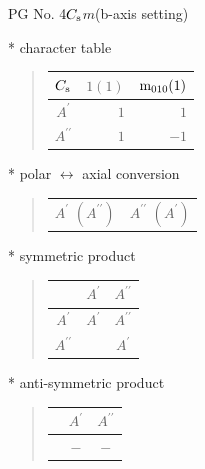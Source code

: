 \documentclass[fleqn,8pt,landscape]{jsarticle}
\begin{document}
\setcounter{MaxMatrixCols}{32}

\renewcommand{\tablename}{Table~}
\renewcommand{\figurename}{Figure~}
\begin{center}
\LARGE
PG No. 4\quad$C_{\rm s}$\quad$m$\quad(b-axis setting)\quad[ monoclinic ]
\end{center}

* character table
\begin{quote}
\begin{tabular}{crr} \hline \hline
$ C_{\rm s} $ & $ 1(1) $ & $ {\rm m}_{010}(1) $ \\ \hline
$ A^{\prime} $ & $ 1 $ & $ 1 $ \\
$ A^{\prime\prime} $ & $ 1 $ & $ -1 $ \\
 \hline \hline
\end{tabular}
\end{quote}

* polar $\leftrightarrow$ axial conversion
\begin{quote}
\begin{tabular}{cc}
$ A^{\prime}\,\,(A^{\prime\prime}) $ & $ A^{\prime\prime}\,\,(A^{\prime}) $
\end{tabular}
\end{quote}

* symmetric product
\begin{quote}
\begin{tabular}{c|cc} \hline \hline
 & $ A^{\prime} $ & $ A^{\prime\prime} $ \\ \hline
$ A^{\prime} $ & $ A^{\prime} $ & $ A^{\prime\prime} $ \\
$ A^{\prime\prime} $ & $  $ & $ A^{\prime} $ \\
 \hline \hline
\end{tabular}
\end{quote}

* anti-symmetric product
\begin{quote}
\begin{tabular}{ccc} \hline \hline
 & $ A^{\prime} $ & $ A^{\prime\prime} $ \\ \hline
$  $ & $ - $ & $ - $ \\
 \hline \hline
\end{tabular}
\end{quote}
\end{document}
